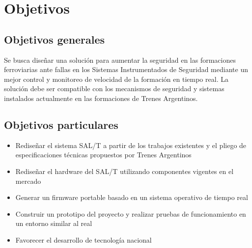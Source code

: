 \section{Objetivos}

\subsection{Objetivos generales}

Se busca diseñar una solución para aumentar la seguridad en las formaciones ferroviarias ante fallas en los Sistemas Instrumentados de Seguridad mediante un mejor control y monitoreo de velocidad de la formación en tiempo real. La solución debe ser compatible con los mecanismos de seguridad y  sistemas instalados actualmente en las formaciones de Trenes Argentinos. 


\subsection{Objetivos particulares}

\begin{itemize}
    \item Rediseñar el sistema SAL/T a partir de los trabajos existentes y el pliego de especificaciones técnicas propuestos por Trenes Argentinos 
    \item Rediseñar el hardware del SAL/T utilizando componentes vigentes en el mercado
    \item Generar un firmware portable basado en un sistema operativo de tiempo real
    \item Construir un prototipo del proyecto y realizar pruebas de funcionamiento en un entorno similar al real
    \item Favorecer el desarrollo de tecnología nacional 
\end{itemize}
